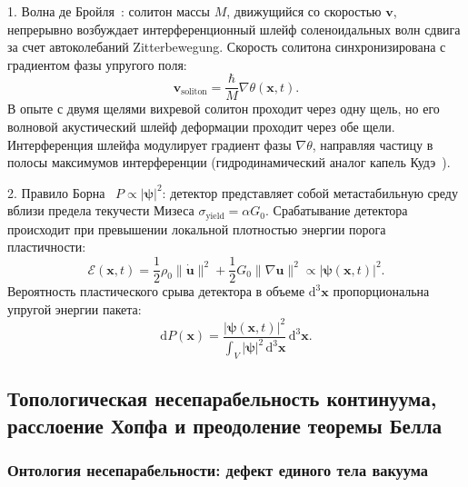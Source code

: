 \documentclass[11pt,a4paper]{article}
\theoremstyle{definition}
\theoremstyle{remark}
\begin{document}
1. Волна де Бройля~\cite{deBroglie1927}: солитон массы $M$, движущийся со скоростью $\mathbf{v}$, непрерывно возбуждает интерференционный шлейф соленоидальных волн сдвига за счет автоколебаний Zitterbewegung. Скорость солитона синхронизирована с градиентом фазы упругого поля:
\begin{equation}
	\mathbf{v}_{\mathrm{soliton}} = \frac{\hbar}{M} \nabla\theta(\mathbf{x}, t).
	\label{eq:de_broglie_guidance}
\end{equation}
В опыте с двумя щелями вихревой солитон проходит через одну щель, но его волновой акустический шлейф деформации проходит через обе щели. Интерференция шлейфа модулирует градиент фазы $\nabla\theta$, направляя частицу в полосы максимумов интерференции (гидродинамический аналог капель Кудэ~\cite{CouderFort2006}).

2. Правило Борна~\cite{Born1926} $P \propto |\boldsymbol{\psi}|^2$: детектор представляет собой метастабильную среду вблизи предела текучести Мизеса $\sigma_{\mathrm{yield}} = \alpha G_0$. Срабатывание детектора происходит при превышении локальной плотностью энергии порога пластичности:
\begin{equation}
    \mathcal{E}(\mathbf{x}, t) = \frac{1}{2}\rho_0 \|\dot{\mathbf{u}}\|^2 + \frac{1}{2}G_0 \|\nabla\mathbf{u}\|^2 \propto |\boldsymbol{\psi}(\mathbf{x}, t)|^2.
    \label{eq:born_energy_proportionality}
\end{equation}
Вероятность пластического срыва детектора в объеме $\mathrm{d}^3\mathbf{x}$ пропорциональна упругой энергии пакета:
\begin{equation}
	\mathrm{d}P(\mathbf{x}) = \frac{|\boldsymbol{\psi}(\mathbf{x}, t)|^2}{\int_V |\boldsymbol{\psi}|^2 \, \mathrm{d}^3\mathbf{x}} \, \mathrm{d}^3\mathbf{x}.
	\label{eq:born_probability_exact}
\end{equation}

\subsection{Топологическая несепарабельность континуума, расслоение Хопфа и преодоление теоремы Белла}

\subsubsection{Онтология несепарабельности: дефект единого тела вакуума}
\end{document}
